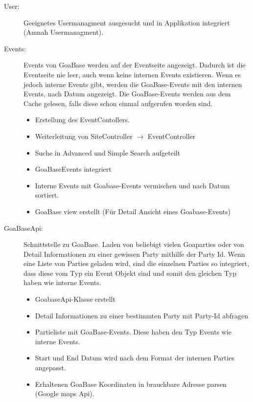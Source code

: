 \documentclass{article}
\begin{document}
\begin{description}

    \item[User:]
    Geeignetes Usermanagment ausgesucht und in Applikation integriert (Amnah Usermanagment). 

   \item[Events:]
   Events von GoaBase werden auf der Eventseite angezeigt. Dadurch ist die Eventseite nie leer, auch wenn keine internen Events existieren. Wenn es jedoch interne Events gibt, werden die GoaBase-Events mit den internen Events, nach Datum angezeigt. Die GoaBase-Events werden aus dem Cache gelesen, falls diese schon einmal aufgerufen worden sind.
      \begin{itemize}
      \item Erstellung des EventContollers.
      \item Weiterleitung von SiteController $\rightarrow$ EventController
      \item Suche in Advanced und Simple Search aufgeteilt
      \item GoaBase\-Events integriert
      \item Interne Events mit Goabase-Events vermischen und nach Datum sortiert.
      \item GoaBase view erstellt (Für Detail Ansicht eines Goabase-Events)
      \end{itemize}
      
    \item[GoaBaseApi:]
    Schnittstelle zu GoaBase. Laden von beliebigt vielen Goaparties oder von Detail Informationen zu einer gewissen Party mithilfe der Party Id.
    Wenn eine Liste von Parties geladen wird, sind die einzelnen Parties so integriert, dass diese vom Typ ein Event Objekt sind und somit den gleichen Typ haben wie interne Events. 
    
    \begin{itemize}
    \item GoabaseApi-Klasse erstellt
    \item Detail Informationen zu einer bestimmten Party mit Party-Id abfragen
    \item Partieliste mit GoaBase-Events. Diese haben den Typ Events wie interne Events.
    \item Start und End Datum wird nach dem Format der internen Parties angepasst.
    \item Erhaltenen GoaBase Koordinaten in brauchbare Adresse parsen (Google maps Api).
    \end{itemize}
    

\end{description}
\end{document}
